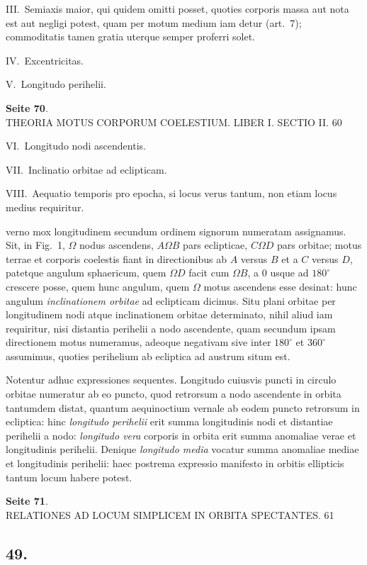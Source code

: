 \documentclass[12pt,a4paper]{article}
\begin{document}
III.~Semiaxis maior, qui quidem omitti posset, quoties corporis massa aut nota est aut negligi potest, quam per motum medium iam detur (art.~7); commoditatis tamen gratia uterque semper proferri solet.

IV.~Excentricitas.

V.~Longitudo perihelii.

\textbf{Seite 70}.\\
THEORIA MOTUS CORPORUM COELESTIUM. LIBER I. SECTIO II. 60

VI.~Longitudo nodi ascendentis.

VII.~Inclinatio orbitae ad eclipticam.

VIII.~Aequatio temporis pro epocha, si locus verus tantum, non etiam locus medius requiritur.

verno mox longitudinem secundum ordinem signorum numeratam assignamus. Sit, in Fig.~1, $\Omega$ nodus ascendens, $A \Omega B$ pars eclipticae, $C \Omega D$ pars orbitae; motus terrae et corporis coelestis fiant in directionibus ab $A$ versus $B$ et a $C$ versus $D$, patetque angulum sphaericum, quem $\Omega D$ facit cum $\Omega B$, a $0$ usque ad $180^\circ$ crescere posse, quem hunc angulum, quem $\Omega$ motus ascendens esse desinat: hunc angulum \emph{inclinationem orbitae} ad eclipticam dicimus. Situ plani orbitae per longitudinem nodi atque inclinationem orbitae determinato, nihil aliud iam requiritur, nisi distantia perihelii a nodo ascendente, quam secundum ipsam directionem motus numeramus, adeoque negativam sive inter $180^\circ$ et $360^\circ$ assumimus, quoties perihelium ab ecliptica ad austrum situm est.

Notentur adhuc expressiones sequentes. Longitudo cuiusvis puncti in circulo orbitae numeratur ab eo puncto, quod retrorsum a nodo ascendente in orbita tantumdem distat, quantum aequinoctium vernale ab eodem puncto retrorsum in ecliptica: hinc \emph{longitudo perihelii} erit summa longitudinis nodi et distantiae perihelii a nodo: \emph{longitudo vera} corporis in orbita erit summa anomaliae verae et longitudinis perihelii. Denique \emph{longitudo media} vocatur summa anomaliae mediae et longitudinis perihelii: haec postrema expressio manifesto in orbitis ellipticis tantum locum habere potest.

\textbf{Seite 71}.\\
RELATIONES AD LOCUM SIMPLICEM IN ORBITA SPECTANTES. 61

\subsection*{49.}
\end{document}
